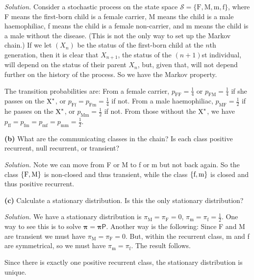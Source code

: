 \documentclass[
  a4paper,
]{article}
\theoremstyle{definition}
\theoremstyle{definition}
\theoremstyle{definition}
\theoremstyle{remark}
\begin{document}
\begin{myanswers}

\emph{Solution.}
Consider a stochastic process on the state space \(\mathcal S = \{\text{F}, \text{M}, \text{m}, \text{f}\}\), where F means the first-born child is a female carrier, M means the child is a male haemophiliac, f means the child is a female non-carrier, and m means the child is a male without the disease. (This is not the only way to set up the Markov chain.) If we let \((X_n)\) be the status of the first-born child at the \(n\)th generation, then it is clear that \(X_{n+1}\), the status of the \((n+1)\)st individual, will depend on the status of their parent \(X_n\), but, given that, will not depend further on the history of the process. So we have the Markov property.

The transition probabilities are: From a female carrier, \(p_{\mathrm{FF}} = \frac14\) or \(p_{\mathrm{FM}} = \frac14\) if she passes on the \(\text X^*\), or \(p_{\mathrm{Ff}} = p_{\mathrm{Fm}} = \frac14\) if not. From a male haemophiliac, \(p_{\mathrm{MF}} = \frac12\) if he passes on the \(\text X^*\), or \(p_{\mathrm{Mm}} = \frac12\) if not. From those without the \(\text X^*\), we have \(p_{\mathrm{ff}} = p_{\mathrm{fm}} = p_{\mathrm{mf}} =p_{\mathrm{mm}} = \frac12\).

\end{myanswers}

\textbf{(b)} What are the communicating classes in the chain? Is each class positive recurrent, null recurrent, or transient?

\begin{myanswers}

\emph{Solution.}
Note we can move from F or M to f or m but not back again. So the class \(\{\text F, \text M\}\) is non-closed and thus transient, while the class \(\{\text f, \text m\}\) is closed and thus positive recurrent.

\end{myanswers}

\textbf{(c)} Calculate a stationary distribution. Is this the only stationary distribution?

\begin{myanswers}

\emph{Solution.}
We have a stationary distribution is \(\pi_{\mathrm M} = \pi_{\mathrm{F}} = 0\), \(\pi_{\mathrm m} = \pi_{\mathrm f} = \frac12\). One way to see this is to solve \(\boldsymbol\pi = \boldsymbol\pi\mathsf P\). Another way is the following: Since F and M are transient we must have \(\pi_{\mathrm M} = \pi_{\mathrm{F}} = 0\). But, within the recurrent class, m and f are symmetrical, so we must have \(\pi_{\mathrm m} = \pi_{\mathrm f}\). The result follows.

Since there is exactly one positive recurrent class, the stationary distribution is unique.

\end{myanswers}
\end{document}
